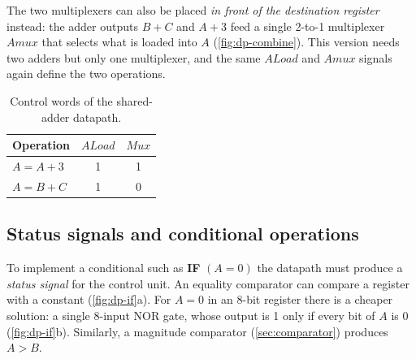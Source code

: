 
The two multiplexers can also be placed \emph{in front of the destination register} instead: the adder outputs $B+C$ and $A+3$ feed a single 2-to-1 multiplexer $Amux$ that selects what is loaded into $A$ (\cref{fig:dp-combine}). This version needs two adders but only one multiplexer, and the same $ALoad$ and $Amux$ signals again define the two operations.


\begin{table}[htbp]
\centering
\caption{Control words of the shared-adder datapath.}
\label{tab:cw1}
\begin{tabular}{l|cc}
\toprule Operation & $ALoad$ & $Mux$\\ \midrule
$A=A+3$ & 1 & 1\\ $A=B+C$ & 1 & 0\\ \bottomrule
\end{tabular}
\end{table}

\subsection{Status signals and conditional operations}
To implement a conditional such as \textbf{IF} $(A=0)$ the datapath must produce a \emph{status signal} for the control unit. An equality comparator can compare a register with a constant (\cref{fig:dp-if}a). For $A=0$ in an 8-bit register there is a cheaper solution: a single 8-input NOR gate, whose output is 1 only if every bit of $A$ is 0 (\cref{fig:dp-if}b). Similarly, a magnitude comparator (\cref{sec:comparator}) produces $A>B$.


